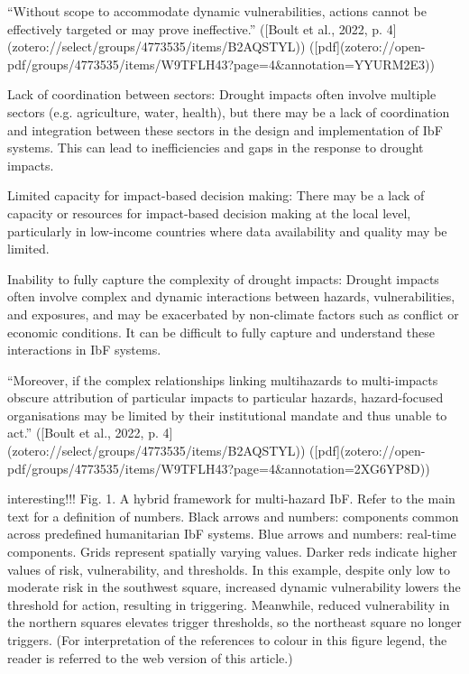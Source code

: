“Without scope to accommodate dynamic vulnerabilities, actions cannot be effectively targeted or may prove ineffective.” ([Boult et al., 2022, p. 4](zotero://select/groups/4773535/items/B2AQSTYL)) ([pdf](zotero://open-pdf/groups/4773535/items/W9TFLH43?page=4&annotation=YYURM2E3))

Lack of coordination between sectors: Drought impacts often involve multiple sectors (e.g. agriculture, water, health), but there may be a lack of coordination and integration between these sectors in the design and implementation of IbF systems. This can lead to inefficiencies and gaps in the response to drought impacts.

Limited capacity for impact-based decision making: There may be a lack of capacity or resources for impact-based decision making at the local level, particularly in low-income countries where data availability and quality may be limited.

Inability to fully capture the complexity of drought impacts: Drought impacts often involve complex and dynamic interactions between hazards, vulnerabilities, and exposures, and may be exacerbated by non-climate factors such as conflict or economic conditions. It can be difficult to fully capture and understand these interactions in IbF systems.

“Moreover, if the complex relationships linking multihazards to multi-impacts obscure attribution of particular impacts to particular hazards, hazard-focused organisations may be limited by their institutional mandate and thus unable to act.” ([Boult et al., 2022, p. 4](zotero://select/groups/4773535/items/B2AQSTYL)) ([pdf](zotero://open-pdf/groups/4773535/items/W9TFLH43?page=4&annotation=2XG6YP8D))

interesting!!! Fig. 1. A hybrid framework for multi-hazard IbF. Refer to the main text for a definition of numbers. Black arrows and numbers: components common across predefined humanitarian IbF systems. Blue arrows and numbers: real-time components. Grids represent spatially varying values. Darker reds indicate higher values of risk, vulnerability, and thresholds. In this example, despite only low to moderate risk in the southwest square, increased dynamic vulnerability lowers the threshold for action, resulting in triggering. Meanwhile, reduced vulnerability in the northern squares elevates trigger thresholds, so the northeast square no longer triggers. (For interpretation of the references to colour in this figure legend, the reader is referred to the web version of this article.)

